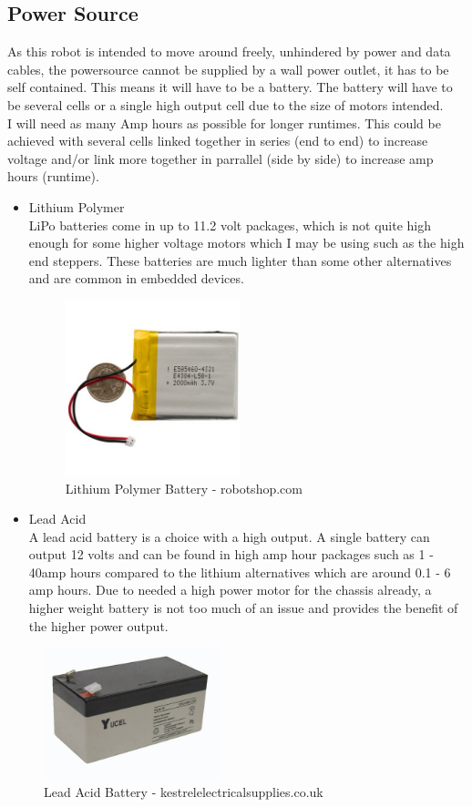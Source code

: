 \subsection{Power Source}
As this robot is intended to move around freely, unhindered by power and data cables, the powersource cannot be supplied by a wall power outlet, it has to be self contained.  This means it will have to be a battery.  The battery will have to be several cells or a single high output cell due to the size of motors intended.
\\I will need as many Amp hours as possible for longer runtimes.  This could be achieved with several cells linked together in series (end to end) to increase voltage and/or link more together in parrallel (side by side) to increase amp hours (runtime).
\begin{itemize}
\item Lithium Polymer
\\LiPo batteries come in up to 11.2 volt packages, which is not quite high enough for some higher voltage motors which I may be using such as the high end steppers.  These batteries are much lighter than some other alternatives and are common in embedded devices.
\begin{figure}[h]
\centering
        \includegraphics[width=2.0in] {Images/lipo-front.jpg}
        \caption{Lithium Polymer Battery - robotshop.com}
        \label{Lithium Polymer Battery}
\end{figure}

\item Lead Acid
\\A lead acid battery is a choice with a high output.  A single battery can output 12 volts and can be found in high amp hour packages such as 1 - 40amp hours compared to the lithium alternatives which are around 0.1 - 6 amp hours.  Due to needed a high power motor for the chassis already, a higher weight battery is not too much of an issue and provides the benefit of the higher power output.
\end{itemize}
\begin{figure}[h]
\centering
        \includegraphics[width=2.0in] {Images/lead-acid.jpg}
        \caption{Lead Acid Battery - kestrelelectricalsupplies.co.uk}
        \label{Lead Acid Battery}
\end{figure}

